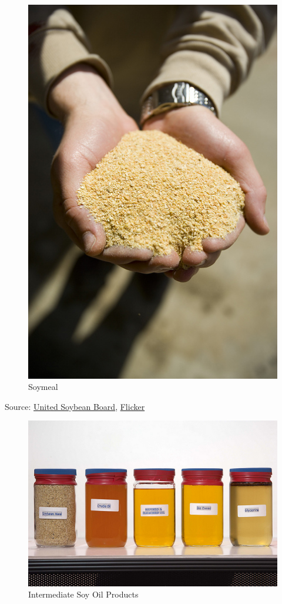 \documentclass[
  letterpaper,
  DIV=11,
  numbers=noendperiod]{scrreprt}
\begin{document}
\begin{figure}

{\centering \includegraphics{images/soymeal.jpg}

}

\caption{Soymeal}

\end{figure}

Source: \href{http://unitedsoybean.org/}{United Soybean Board},
\href{https://www.flickr.com/photos/unitedsoybean/10059074033/}{Flicker}

\begin{figure}

{\centering \includegraphics{images/crush_products.jpg}

}

\caption{Intermediate Soy Oil Products}

\end{figure}
\end{document}
